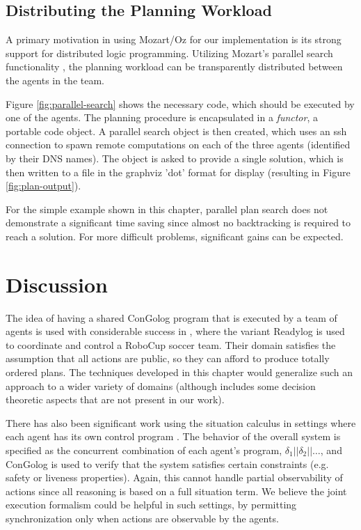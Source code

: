 \subsection{Distributing the Planning Workload}

A primary motivation in using Mozart/Oz for our implementation is
its strong support for distributed logic programming. Utilizing Mozart's
parallel search functionality \citep{Schulte00constraint_services},
the planning workload can be transparently distributed between the
agents in the team.

Figure \ref{fig:parallel-search} shows the necessary code, which
should be executed by one of the agents. The planning procedure is
encapsulated in a \emph{functor}, a portable code object. A parallel
search object is then created, which uses an ssh connection to spawn
remote computations on each of the three agents (identified by their
DNS names). The object is asked to provide a single solution, which
is then written to a file in the graphviz 'dot' format for display
(resulting in Figure \ref{fig:plan-output}).

For the simple example shown in this chapter, parallel plan search
does not demonstrate a significant time saving since almost no backtracking
is required to reach a solution. For more difficult problems, significant
gains can be expected.


\section{Discussion\label{sec:JointExec:Discussion}}

The idea of having a shared ConGolog program that is executed by a
team of agents is used with considerable success in \citep{Ferrein2005readylog},
where the variant Readylog is used to coordinate and control a RoboCup
soccer team. Their domain satisfies the assumption that all actions
are public, so they can afford to produce totally ordered plans. The
techniques developed in this chapter would generalize such an approach
to a wider variety of domains (although \citep{Ferrein2005readylog}
includes some decision theoretic aspects that are not present in our
work).

There has also been significant work using the situation calculus
in settings where each agent has its own control program \citep{shapiro02casl}.
The behavior of the overall system is specified as the concurrent
combination of each agent's program, $\delta_{1}||\delta_{2}||\dots$,
and ConGolog is used to verify that the system satisfies certain constraints
(e.g. safety or liveness properties). Again, this cannot handle partial
observability of actions since all reasoning is based on a full situation
term. We believe the joint execution formalism could be helpful in
such settings, by permitting synchronization only when actions are
observable by the agents.

